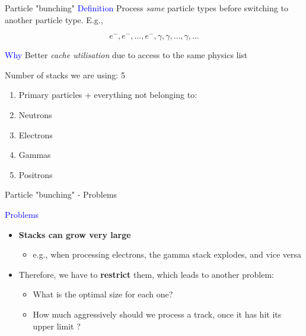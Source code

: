 \documentclass{beamer}
\begin{document}
\begin{frame}{Particle "bunching"}
\textcolor{blue}{Definition}
Process \textit{same} particle types before switching to another particle type. E.g.,

\begin{equation*}
e^-, e^-, \ldots, e^-, \gamma, \gamma, \ldots, \gamma, \ldots
\end{equation*}

\textcolor{blue}{Why} Better \textit{cache utilisation} due to access to the
same physics list

\vspace{5 mm}

Number of stacks we are using: 5

\begin{enumerate}
\item Primary particles + everything not belonging to:
\item Neutrons
\item Electrons
\item Gammas
\item Positrons
\end{enumerate}
\end{frame}

\begin{frame}{Particle "bunching" - Problems}

\textcolor{blue}{Problems}
\begin{itemize}
\item {\bf Stacks can grow very large}
\begin{itemize}
\item e.g., when processing electrons, the gamma stack explodes, and vice versa
\end{itemize}
\item Therefore, we have to {\bf restrict} them, which leads to another problem:
\begin{itemize}
\item What is the optimal size for each one?
\item How much aggressively should we process a track, once it has hit its upper limit ?
\end{itemize}
\end{itemize}
\end{frame}
\end{document}
